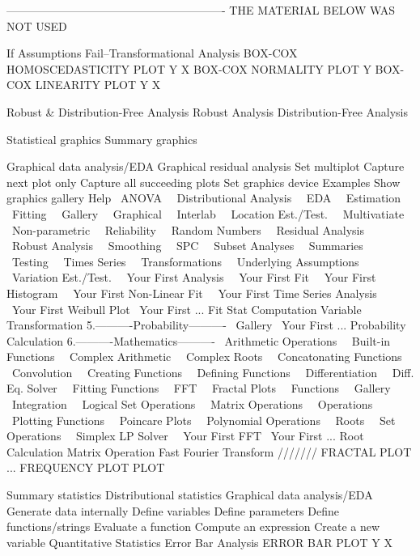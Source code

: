  
 
 
 
 
 
 
 
 
 
 
 
 
 
 
 
 
 
 
 
----------------------------------------------------------
THE MATERIAL BELOW WAS NOT USED
 
If Assumptions Fail--Transformational Analysis
   BOX-COX HOMOSCEDASTICITY PLOT Y X
   BOX-COX NORMALITY PLOT Y
   BOX-COX LINEARITY PLOT Y X
 
Robust & Distribution-Free Analysis
   Robust Analysis
   Distribution-Free Analysis
 
Statistical graphics
Summary graphics
 
Graphical data analysis/EDA
Graphical residual analysis
Set multiplot
Capture next plot only
Capture all succeeding plots
Set graphics device
Examples
Show graphics gallery
Help
~ANOVA~
~Distributional Analysis~
~EDA~
~Estimation~
~Fitting~
~Gallery~
~Graphical~
~Interlab~
~Location Est./Test.~
~Multivatiate~
~Non-parametric~
~Reliability~
~Random Numbers~
~Residual Analysis~
~Robust Analysis~
~Smoothing~
~SPC~
~Subset Analyses~
~Summaries~
~Testing~
~Times Series~
~Transformations~
~Underlying Assumptions~
~Variation Est./Test.~
~Your First Analysis~
~Your First Fit~
~Your First Histogram~
~Your First Non-Linear Fit~
~Your First Time Series Analysis~
~Your First Weibull Plot~
Your First ...
Fit
Stat Computation
Variable Transformation
5.----------Probability----------
~Gallery~
Your First ...
Probability Calculation
6.----------Mathematics----------
~Arithmetic Operations~
~Built-in Functions~
~Complex Arithmetic~
~Complex Roots~
~Concatonating Functions~
~Convolution~
~Creating Functions~
~Defining Functions~
~Differentiation~
~Diff. Eq. Solver~
~Fitting Functions~
~FFT~
~Fractal Plots~
~Functions~
~Gallery~
~Integration~
~Logical Set Operations~
~Matrix Operations~
~Operations~
~Plotting Functions~
~Poincare Plots~
~Polynomial Operations~
~Roots~
~Set Operations~
~Simplex LP Solver~
~Your First FFT~
Your First ...
Root Calculation
Matrix Operation
Fast Fourier Transform
///////
FRACTAL PLOT
... FREQUENCY PLOT
PLOT
 
 
Summary statistics
Distributional statistics
Graphical data analysis/EDA
Generate data internally
Define variables
Define parameters
Define functions/strings
Evaluate a function
Compute an expression
Create a new variable
Quantitative Statistics
Error Bar Analysis
ERROR BAR PLOT Y X
 
